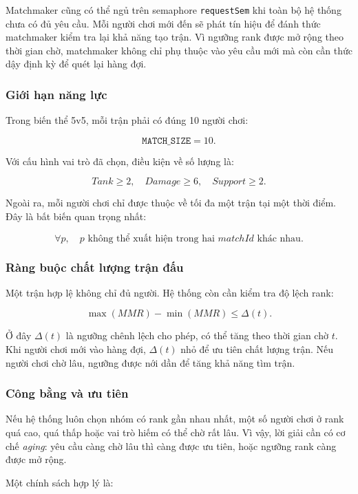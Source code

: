 Matchmaker cũng có thể ngủ trên semaphore \texttt{requestSem} khi toàn bộ hệ
thống chưa có đủ yêu cầu. Mỗi người chơi mới đến sẽ phát tín hiệu để đánh thức
matchmaker kiểm tra lại khả năng tạo trận. Vì ngưỡng rank được mở rộng theo
thời gian chờ, matchmaker không chỉ phụ thuộc vào yêu cầu mới mà còn cần thức
dậy định kỳ để quét lại hàng đợi.

\subsubsection*{Giới hạn năng lực}

Trong biến thể 5v5, mỗi trận phải có đúng 10 người chơi:

\[
    \texttt{MATCH\_SIZE} = 10.
\]

Với cấu hình vai trò đã chọn, điều kiện về số lượng là:

\[
    Tank \geq 2,\quad Damage \geq 6,\quad Support \geq 2.
\]

Ngoài ra, mỗi người chơi chỉ được thuộc về tối đa một trận tại một thời điểm.
Đây là bất biến quan trọng nhất:

\[
    \forall p,\quad p \text{ không thể xuất hiện trong hai } matchId
    \text{ khác nhau.}
\]

\subsubsection*{Ràng buộc chất lượng trận đấu}

Một trận hợp lệ không chỉ đủ người. Hệ thống còn cần kiểm tra độ lệch rank:

\[
    \max(MMR) - \min(MMR) \leq \Delta(t).
\]

Ở đây \(\Delta(t)\) là ngưỡng chênh lệch cho phép, có thể tăng theo thời gian
chờ \(t\). Khi người chơi mới vào hàng đợi, \(\Delta(t)\) nhỏ để ưu tiên chất
lượng trận. Nếu người chơi chờ lâu, ngưỡng được nới dần để tăng khả năng tìm
trận.

\subsubsection*{Công bằng và ưu tiên}

Nếu hệ thống luôn chọn nhóm có rank gần nhau nhất, một số người chơi ở rank
quá cao, quá thấp hoặc vai trò hiếm có thể chờ rất lâu. Vì vậy, lời giải cần
có cơ chế \textit{aging}: yêu cầu càng chờ lâu thì càng được ưu tiên, hoặc
ngưỡng rank càng được mở rộng.

Một chính sách hợp lý là:

